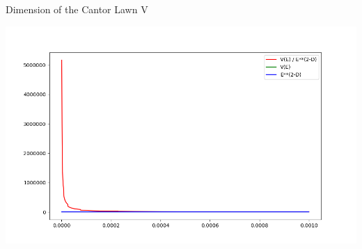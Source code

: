 \documentclass{if-beamer}
\begin{document}
\begin{frame}{Dimension of the Cantor Lawn V}
	\begin{center}
		\includegraphics[scale=0.40]{CantorLawnVolumePlot_Alpha-1.png}
	\end{center}
\end{frame}
\end{document}
